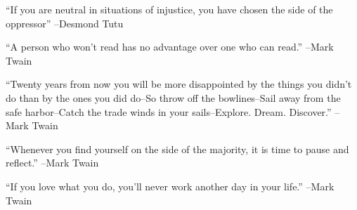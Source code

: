 \documentclass{article}%
\begin{document}
\linebreak%
\vspace{1mm}%
\begin{minipage}{\textwidth}%
\flushleft%
“If you are neutral in situations of injustice, you have chosen the side of the oppressor”%
\linebreak%
\vspace{1mm}%
–Desmond Tutu%
\linebreak%
\vspace{1mm}%
\end{minipage}%
\linebreak%
\vspace{1mm}%
\begin{minipage}{\textwidth}%
\flushleft%
“A person who won't read has no advantage over one who can read.”%
\linebreak%
\vspace{1mm}%
–Mark Twain%
\linebreak%
\vspace{1mm}%
\end{minipage}%
\linebreak%
\vspace{1mm}%
\begin{minipage}{\textwidth}%
\flushleft%
“Twenty years from now you will be more disappointed by the things you didn't do than by the ones you did do–So throw off the bowlines–Sail away from the safe harbor–Catch the trade winds in your sails–Explore. Dream. Discover.”%
\linebreak%
\vspace{1mm}%
–Mark Twain%
\linebreak%
\vspace{1mm}%
\end{minipage}%
\linebreak%
\vspace{1mm}%
\begin{minipage}{\textwidth}%
\flushleft%
“Whenever you find yourself on the side of the majority, it is time to pause and reflect.”%
\linebreak%
\vspace{1mm}%
–Mark Twain%
\linebreak%
\vspace{1mm}%
\end{minipage}%
\linebreak%
\vspace{1mm}%
\begin{minipage}{\textwidth}%
\flushleft%
“If you love what you do, you'll never work another day in your life.”%
\linebreak%
\vspace{1mm}%
–Mark Twain%
\linebreak%
\vspace{1mm}%
\end{minipage}%
\end{document}

